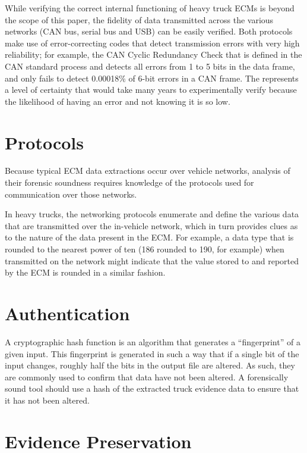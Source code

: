 While verifying the correct internal functioning of heavy truck ECMs is beyond the scope of this paper, the fidelity of data transmitted across the various networks (CAN bus, serial 
bus and USB) can be easily verified. Both protocols make use of error-correcting codes that detect transmission errors with very high reliability; for example, the CAN 
Cyclic Redundancy Check that is defined in the CAN standard process and detects all errors from 1 to 5 bits in the data frame, and only fails to detect 0.00018\% of 6-bit 
errors in a CAN frame\cite{koopman2004}. The represents a level of certainty that would take many years to experimentally verify because the likelihood of having an error and not knowing 
it is so low.

\section{Protocols}

Because typical ECM data extractions occur over vehicle networks, analysis of their forensic soundness requires knowledge of the protocols used for communication over those networks.

In heavy trucks, the networking protocols enumerate and define the various data that are transmitted over the in-vehicle network, which in turn provides clues as to the nature 
of the data present in the ECM. For example, a data type that is rounded to the nearest power of ten (186 rounded to 190, for example) when transmitted on the network might 
indicate that the value stored to and reported by the ECM is rounded in a similar fashion.

\section{Authentication}

A cryptographic hash function is an algorithm that generates a “fingerprint” of a given input. This fingerprint is generated in such a way that if a single bit of the input changes, 
roughly half the bits in the output file are altered\cite{schneier1996}. As such, they are commonly used to confirm that data have not been altered. A forensically sound tool should use a hash of 
the extracted truck evidence data to ensure that it has not been altered.

\section{Evidence Preservation}


